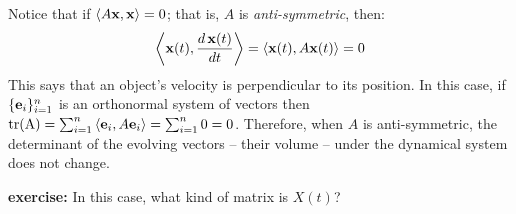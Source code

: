 \documentclass{article}
\begin{document}
Notice that if $\left< A {\bf x}, {\bf x} \right> = 0$; that is, $A$ is
{\em anti-symmetric\/},
then:
\begin{eqnarray}
  \left< {\bf x}(t), \frac{d \, {\bf x}(t)}{dt} \right>
  = \left< {\bf x}(t), A {\bf x}(t)\right> = 0
\end{eqnarray}
This says that an object's
velocity is perpendicular to its position. In this case, if $\{{\bf e}_i\}_{i=1}^n$ is
an orthonormal system of vectors then
${\rm tr(A)} = \sum_{i=1}^n \left< {\bf e}_i, A {\bf e}_i \right> = \sum_{i=1}^n 0 = 0$.
Therefore, when $A$ is anti-symmetric, the determinant of the evolving
vectors -- their volume -- under the dynamical system does not change.

{\bf exercise:\/} In this case, what kind of matrix is $X(t)$?
\end{document}
